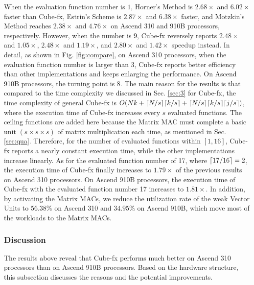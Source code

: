 When the evaluation function number is $1$, Horner's Method is $2.68\times$ and $6.02\times$ faster than Cube-fx, Estrin's Scheme is $2.87\times$ and $6.38\times$ faster, and Motzkin's Method reaches $2.38\times$ and $4.76\times$ on Ascend 310 and 910B processors, respectively. However, when the number is $9$, Cube-fx reversely reports $2.48\times$ and $1.05\times$, $2.48\times$ and $1.19\times$, and $2.80\times$ and $1.42\times$ speedup instead. In detail, as shown in Fig. \ref{fig:compare}, on Ascend 310 processors, when the evaluation function number is larger than 3, Cube-fx reports better efficiency than other implementations and keeps enlarging the performance. On Ascend 910B processors, the turning point is 8. The main reason for the results is that compared to the time complexity we discussed in Sec. \ref{sec:3} for Cube-fx, the time complexity of general Cube-fx is $O(Nk + \lceil N / s\rceil \lceil k / s\rceil + \lceil N / s\rceil \lceil k / s\rceil \lceil j / s\rceil)$, where the execution time of Cube-fx increases every $s$ evaluated functions. The ceiling functions are added here because the Matrix MAC must complete a basic unit $(s \times s \times s)$ of matrix multiplication each time, as mentioned in Sec. \ref{sec:qua}. Therefore, for the number of evaluated functions within $[1, 16]$, Cube-fx reports a nearly constant execution time, while the other implementations increase linearly. As for the evaluated function number of 17, where $\lceil17 / 16\rceil = 2$, the execution time of Cube-fx finally increases to $1.79\times$ of the previous results on Ascend 310 processors. On Ascend 910B processors, the execution time of Cube-fx with the evaluated function number 17 increases to $1.81\times$. In addition, by activating the Matrix MACs, we reduce the utilization rate of the weak Vector Units to $56.38\%$ on Ascend 310 and $34.95\%$ on Ascend 910B, which move most of the workloads to the Matrix MACs.

\subsubsection{Discussion \label{sec:dis_1}}

The results above reveal that Cube-fx performs much better on Ascend 310 processors than on Ascend 910B processors. Based on the hardware structure, this subsection discusses the reasons and the potential improvements.

